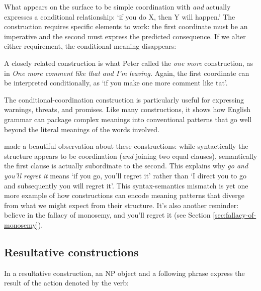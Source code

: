 What appears on the surface to be simple coordination with \textit{and} actually expresses a conditional relationship: `if you do X, then Y will happen.' The construction requires specific elements to work: the first coordinate must be an imperative and the second must express the predicted consequence. If we alter either requirement, the conditional meaning disappears:

\ea\label{ex:conditional-coord-constraints}
   \z
\z

A closely related construction is what Peter \citet{culicover1970one} called the \textit{one more} construction, as in \textit{One more comment like that and I'm leaving.} Again, the first coordinate can be interpreted conditionally, as `if you make one more comment like tat'.

The conditional-coordination construction is particularly useful for expressing warnings, threats, and promises. Like many constructions, it shows how English grammar can package complex meanings into conventional patterns that go well beyond the literal meanings of the words involved.


\begin{tcolorbox}[title=Another Syntax-Semantics Mismatch]
\citet{culicover1997semantic} made a beautiful observation about these constructions: while syntactically the structure appears to be coordination (\textit{and} joining two equal clauses), semantically the first clause is actually subordinate to the second. This explains why \textit{go and you'll regret it} means `if you go, you'll regret it' rather than `I direct you to go and subsequently you will regret it'. This syntax-semantics mismatch is yet one more example of how constructions can encode meaning patterns that diverge from what we might expect from their structure. It's also another reminder: believe in the fallacy of monosemy, and you'll regret it (see Section \ref{sec:fallacy-of-monosemy}).
\end{tcolorbox}

\subsection{Resultative constructions}

In a resultative construction, an NP object and a following phrase express the result of the action denoted by the verb:

